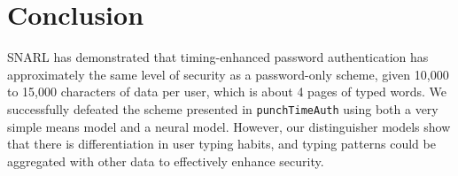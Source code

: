 \documentclass[9pt,journal]{IEEEtran}
\begin{document}
\section{Conclusion}

SNARL has demonstrated that timing-enhanced password authentication has approximately the same level of security as a password-only scheme, given 10,000 to 15,000 characters of data per user, which is about 4 pages of typed words. We successfully defeated the scheme presented in \texttt{punchTimeAuth} using both a very simple means model and a neural model. However, our distinguisher models show that there is differentiation in user typing habits, and typing patterns could be aggregated with other data to effectively enhance security.

\printbibliography
\end{document}
